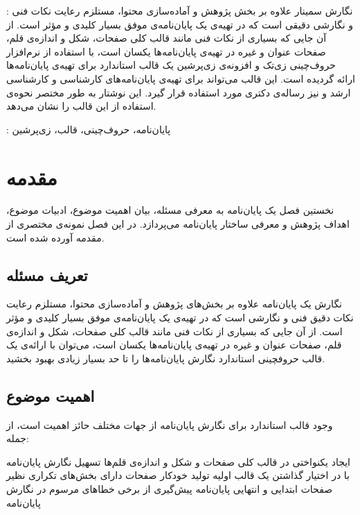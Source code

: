 
 : نگارش سمینار‌ علاوه بر بخش پژوهش و آماده‌سازی محتوا،
مستلزم رعایت نکات فنی و نگارشی دقیقی است
که در تهیه‌ی یک پایان‌نامه‌ی موفق بسیار کلیدی و مؤثر است.
از آن جایی که بسیاری از نکات فنی مانند قالب کلی صفحات، شکل و اندازه‌ی قلم، صفحات عنوان و غیره در تهیه‌ی پایان‌نامه‌ها یکسان است، با استفاده از نرم‌افزار حروف‌چینی زی‌تک   و افزونه‌ی زی‌پرشین   یک قالب استاندارد برای تهیه‌ی پایان‌نامه‌ها ارائه گردیده است.
این قالب می‌تواند برای تهیه‌ی پایان‌نامه‌های کارشناسی و کارشناسی ارشد و نیز رساله‌ی دکتری مورد استفاده قرار گیرد.
این نوشتار به طور مختصر نحوه‌ی استفاده از این قالب را نشان می‌دهد.


 :
پایان‌نامه، حروف‌چینی، قالب، زی‌پرشین

\section{مقدمه}

نخستین فصل یک پایان‌نامه به معرفی مسئله، بیان اهمیت موضوع، ادبیات موضوع،
اهداف پژوهش و معرفی ساختار پایان‌نامه می‌پردازد.
در این فصل نمونه‌ی مختصری از مقدمه آورده شده است.

\subsection{تعریف مسئله}

نگارش یک پایان‌نامه‌ علاوه بر بخش‌های پژوهش و آماده‌سازی محتوا،
مستلزم رعایت نکات دقیق فنی و نگارشی است
که در تهیه‌ی یک پایان‌نامه‌ی موفق بسیار کلیدی و مؤثر است.
از آن جایی که بسیاری از نکات فنی مانند قالب کلی صفحات، شکل و اندازه‌ی قلم،
صفحات عنوان و غیره در تهیه‌ی پایان‌نامه‌ها یکسان است،
می‌توان با ارائه‌ی یک قالب حروفچینی استاندارد
نگارش پایان‌نامه‌ها را تا حد بسیار زیادی بهبود بخشید.


\subsection{اهمیت موضوع}

وجود قالب استاندارد برای نگارش پایان‌نامه از جهات مختلف حائز اهمیت است، از جمله:

 ایجاد یکنواختی در قالب کلی صفحات و شکل و اندازه‌ی قلم‌ها
 تسهیل نگارش پایان‌نامه با در اختیار گذاشتن یک قالب اولیه
 تولید خودکار صفحات دارای بخش‌های تکراری نظیر صفحات ابتدایی و انتهایی پایان‌نامه
 پیش‌گیری از برخی خطاهای مرسوم در نگارش پایان‌نامه

